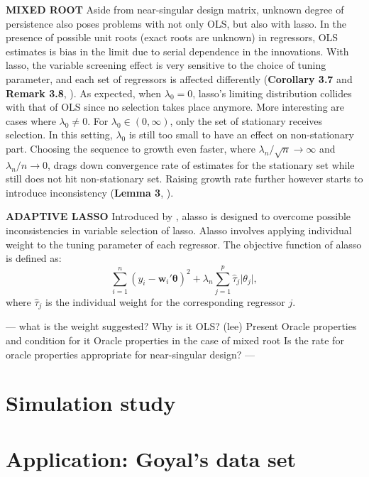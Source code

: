 \documentclass[12pt,a4paper]{article}
\DeclareMathOperator*{\argmin}{arg\,min} %
\begin{document}
\textbf{MIXED ROOT} Aside from near-singular design matrix, unknown degree of persistence also poses problems with not only OLS, but also with lasso. In the presence of possible unit roots (exact roots are unknown) in regressors, OLS estimates is bias in the limit due to serial dependence in the innovations. With lasso, the variable screening effect is very sensitive to the choice of tuning parameter, and each set of regressors is affected differently (\textbf{Corollary 3.7} and \textbf{Remark 3.8}, \cite{lee2018lasso}). As expected, when $ \lambda_0 = 0 $, lasso's limiting distribution collides with that of OLS since no selection takes place anymore. More interesting are cases where $ \lambda_0 \neq 0 $. For $ \lambda_0 \in (0, \infty) $, only the set of stationary receives selection. In this setting, $ \lambda_0 $ is still too small to have an effect on non-stationary part. Choosing the sequence to growth even faster, where  $ \lambda_n/\sqrt{n} \rightarrow \infty $ and $ \lambda_n/n \rightarrow 0 $, drags down convergence rate of estimates for the stationary set while still does not hit non-stationary set. Raising growth rate further however starts to introduce inconsistency (\textbf{Lemma 3}, \cite{zou2006adaptive}).

\textbf{ADAPTIVE LASSO} Introduced by \cite{zou2006adaptive}, alasso is designed to overcome possible inconsistencies in variable selection of lasso. Alasso involves applying individual weight to the tuning parameter of each regressor. The objective function of alasso is defined as:
\begin{equation}\label{eq:7}
	\sum_{i = 1}^n(y_i - \bm{w}_i'\bm{\theta})^2 + 
	\lambda_n\sum_{j = 1}^p \hat{\tau}_j \vert\theta_j\vert,
\end{equation}
where $ \hat{\tau}_j $ is the individual weight for the corresponding regressor $ j $.

--- what is the weight suggested? 
Why is it OLS? (lee) 
Present Oracle properties and condition for it
Oracle properties in the case of mixed root
Is the rate for oracle properties appropriate for near-singular design? ---




\section{Simulation study}

\section{Application: Goyal's data set}



\end{document}
